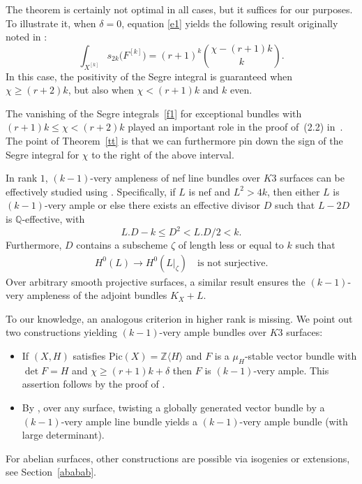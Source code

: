 \documentclass[pdftex]{sigma}
\numberwithin{equation}{section}
\begin{document}
\begin{Remark}%
The theorem is certainly not optimal in all cases, but it suffices for our purposes. To illustrate it, when $\delta=0$, equation \eqref{e1} yields the following result originally noted in \cite[Proposition 2.1]{MOP}:
\begin{equation}\label{f1}
\int_{X^{[k]}} s_{2k}\big(F^{[k]}\big)=(r+1)^k \binom{\chi-(r+1)k}{k}.
\end{equation}
In this case, the positivity of the Segre integral is guaranteed when $\chi\geq (r+2)k$, but also when $\chi<(r+1)k$ and $k$ even.

The vanishing of the Segre integrals~\eqref{f1} for exceptional bundles with $(r+1)k\leq \chi<(r+2)k$ played an important role in the proof of~(2.2) in~\cite{MOP}. The point of Theorem~\ref{tt} is that we can furthermore pin down the sign of the Segre integral for $\chi$ to the right of the above interval.
\end{Remark}

\begin{Remark}\label{remk}
In rank $1$, $(k-1)$-very ampleness of nef line bundles over $K3$ surfaces can be effectively studied using \cite[Theorem~2.1]{BS}. Specifically, if
$L$ is nef and $L^2>4k$, then either $L$ is $(k-1)$-very ample or else there exists an effective divisor $D$ such that $L-2D$ is $\mathbb Q$-effective, with
\begin{equation}\label{kva}
L.D-k\leq D^2<L.D/2<k.
\end{equation}
Furthermore, $D$ contains a subscheme $\zeta$ of length less or equal to $k$ such that
\begin{gather*}
H^0(L)\to H^0(L|_{\zeta})\quad\text{is not surjective.}
\end{gather*}
Over arbitrary smooth projective surfaces, a similar result ensures the $(k-1)$-very ampleness of the adjoint bundles $K_X+L$.

To our knowledge, an analogous criterion in higher rank is missing. We point out two constructions yielding $(k-1)$-very ample bundles over $K3$ surfaces:
\begin{itemize}\itemsep=0pt
\item [$(i)$] If $(X, H)$ satisfies $\text{Pic} (X)=\mathbb Z\langle H\rangle$ and $F$ is a $\mu_H$-stable vector bundle with $\det F=H$ and $\chi\geq (r+1)k+\delta$ then $F$ is $(k-1)$-very ample. This assertion follows by the proof of \cite[Proposition 2.2]{MOP}.
\item [$(ii)$] By \cite[Proposition 4.5]{BBF}, over any surface, twisting a globally generated vector bundle by a~$(k-1)$-very ample line bundle yields a $(k-1)$-very ample bundle (with large determinant).
\end{itemize}
For abelian surfaces, other constructions are possible via isogenies or extensions, see Section~\ref{ababab}.
\end{Remark}
\end{document}
